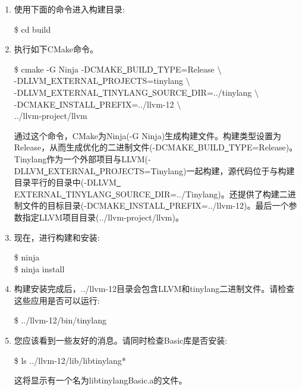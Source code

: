 \begin{enumerate}
\item 使用下面的命令进入构建目录:
	\begin{tcolorbox}[colback=white,colframe=black]
	\$ cd build
	\end{tcolorbox}

\item 执行如下CMake命令。
	\begin{tcolorbox}[colback=white,colframe=black]
	\$ cmake -G Ninja -DCMAKE\underline{~}BUILD\underline{~}TYPE=Release $\setminus$ \\
	-DLLVM\underline{~}EXTERNAL\underline{~}PROJECTS=tinylang $\setminus$ \\
	-DLLVM\underline{~}EXTERNAL\underline{~}TINYLANG\underline{~}SOURCE\underline{~}DIR=../tinylang $\setminus$ \\
	-DCMAKE\underline{~}INSTALL\underline{~}PREFIX=../llvm-12 $\setminus$ \\
	../llvm-project/llvm
	\end{tcolorbox}
	通过这个命令，CMake为Ninja(-G Ninja)生成构建文件。构建类型设置为Release，从而生成优化的二进制文件(-DCMAKE\underline{~}BUILD\underline{~}TYPE=Release)。Tinylang作为一个外部项目与LLVM(-DLLVM\underline{~}EXTERNAL\underline{~}PROJECTS=Tinylang)一起构建，源代码位于与构建目录平行的目录中(-DLLVM\underline{~} EXTERNAL\underline{~}TINYLANG\underline{~}SOURCE\underline{~}DIR=../Tinylang)。还提供了构建二进制文件的目标目录(-DCMAKE\underline{~}INSTALL\underline{~}PREFIX=../llvm-12)。最后一个参数指定LLVM项目目录(../llvm-project/llvm)。
	
\item 现在，进行构建和安装:
\begin{tcolorbox}[colback=white,colframe=black]
\$ ninja \\
\$ ninja install
\end{tcolorbox}

\item 构建安装完成后，../llvm-12目录会包含LLVM和tinylang二进制文件。请检查这些应用是否可以运行:
\begin{tcolorbox}[colback=white,colframe=black]
\$ ../llvm-12/bin/tinylang
\end{tcolorbox}

\item 您应该看到一些友好的消息。请同时检查Basic库是否安装:
\begin{tcolorbox}[colback=white,colframe=black]
	\$ ls ../llvm-12/lib/libtinylang*
\end{tcolorbox}
这将显示有一个名为libtinylangBasic.a的文件。

\end{enumerate}

